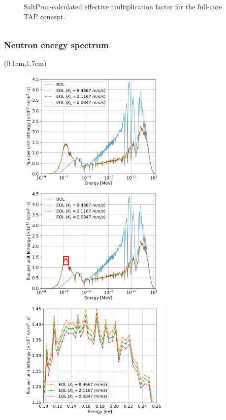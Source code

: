 \begin{frame}
\begin{columns}
\begin{figure}[ht!]
\begin{overprint}
			\vspace{-4mm}
		\end{overprint}
	\caption{SaltProc-calculated effective multiplication factor 
	for the full-core \gls{TAP} concept.}			
	\end{figure}
	
\end{columns}
\end{frame}


\begin{frame}
\frametitle{Neutron energy spectrum}
\begin{textblock*}{12.6cm}(0.1cm,1.7cm) %
	\begin{figure}[htp!] %
		\begin{overprint}
\centerline{\includegraphics[width=0.65\textwidth]{../dissertation/figures/ch4/eps/spectrum.png}}
\centerline{\includegraphics[width=0.65\textwidth]{./images/tap_sp_z_1.png}}
\centerline{\includegraphics[width=0.67\textwidth]{../dissertation/figures/ch4/eps/spectrum_th_zoomed.png}}

\end{overprint}
\end{figure}
\end{textblock*}
\end{frame}
